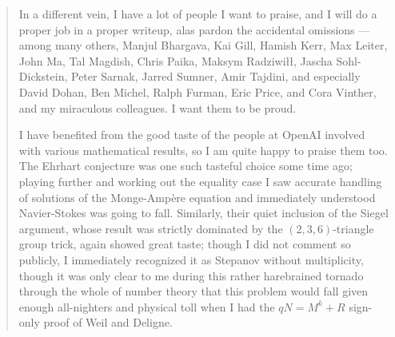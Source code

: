 \documentclass[11pt]{amsbook}
\theoremstyle{plain}
\theoremstyle{definition}
\theoremstyle{remark}
\numberwithin{equation}{section}
\numberwithin{figure}{chapter}
\numberwithin{table}{chapter}
\begin{document}
\begin{quotation}
In a different vein, I have a lot of people I want to praise, and I will do a
proper job in a proper writeup, alas pardon the accidental omissions ---
among many others, Manjul Bhargava, Kai Gill, Hamish Kerr, Max Leiter, John
Ma, Tal Magdish, Chris Paika, Maksym Radziwi\l\l, Jascha Sohl-Dickstein, Peter
Sarnak, Jarred Sumner, Amir Tajdini, and especially David Dohan, Ben Michel,
Ralph Furman, Eric Price, and Cora Vinther, and my miraculous colleagues. I
want them to be proud.

I have benefited from the good taste of the people at OpenAI involved
with various mathematical results, so I am quite happy to praise them too.
The Ehrhart conjecture was one such tasteful choice some time ago; playing
further and working out the equality case I saw accurate handling of
solutions of the Monge-Amp\`ere equation and immediately understood
Navier-Stokes was going to fall. Similarly, their quiet inclusion of the
Siegel argument, whose result was strictly dominated by the
$(2,3,6)$-triangle group trick, again showed great taste; though I did not
comment so publicly, I immediately recognized it as Stepanov without
multiplicity, though it was only clear to me during this rather harebrained
tornado through the whole of number theory that this problem would fall
given enough all-nighters and physical toll when I had the
$qN = M^k + R$ sign-only proof of Weil and Deligne.


\end{quotation}
\end{document}
